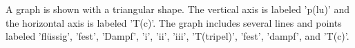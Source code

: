 A graph is shown with a triangular shape. The vertical axis is labeled 'p(lu)' and the horizontal axis is labeled 'T(c)'. The graph includes several lines and points labeled 'flüssig', 'fest', 'Dampf', 'i', 'ii', 'iii', 'T(tripel)', 'fest', 'dampf', and 'T(c)'.